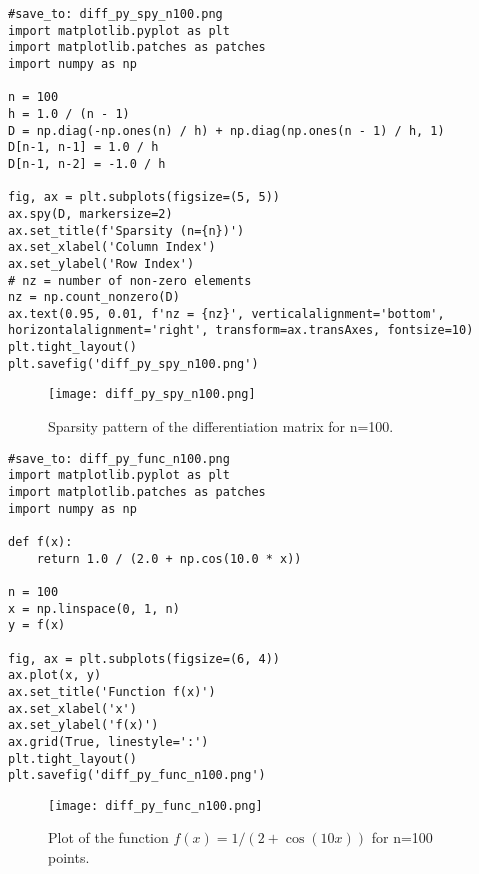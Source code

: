 \documentclass{article}
\begin{document}
\begin{verbatim}
#save_to: diff_py_spy_n100.png
import matplotlib.pyplot as plt
import matplotlib.patches as patches
import numpy as np

n = 100
h = 1.0 / (n - 1)
D = np.diag(-np.ones(n) / h) + np.diag(np.ones(n - 1) / h, 1)
D[n-1, n-1] = 1.0 / h
D[n-1, n-2] = -1.0 / h

fig, ax = plt.subplots(figsize=(5, 5))
ax.spy(D, markersize=2)
ax.set_title(f'Sparsity (n={n})')
ax.set_xlabel('Column Index')
ax.set_ylabel('Row Index')
# nz = number of non-zero elements
nz = np.count_nonzero(D)
ax.text(0.95, 0.01, f'nz = {nz}', verticalalignment='bottom', horizontalalignment='right', transform=ax.transAxes, fontsize=10)
plt.tight_layout()
plt.savefig('diff_py_spy_n100.png')
\end{verbatim}

\begin{figure}[H]
\centering
\texttt{[image: diff\_py\_spy\_n100.png]}
\caption{Sparsity pattern of the differentiation matrix for n=100.}
\label{fig:diff_py_spy_n100}
\end{figure}

\begin{verbatim}
#save_to: diff_py_func_n100.png
import matplotlib.pyplot as plt
import matplotlib.patches as patches
import numpy as np

def f(x):
    return 1.0 / (2.0 + np.cos(10.0 * x))

n = 100
x = np.linspace(0, 1, n)
y = f(x)

fig, ax = plt.subplots(figsize=(6, 4))
ax.plot(x, y)
ax.set_title('Function f(x)')
ax.set_xlabel('x')
ax.set_ylabel('f(x)')
ax.grid(True, linestyle=':')
plt.tight_layout()
plt.savefig('diff_py_func_n100.png')
\end{verbatim}

\begin{figure}[H]
\centering
\texttt{[image: diff\_py\_func\_n100.png]}
\caption{Plot of the function $f(x) = 1 / (2 + \cos(10x))$ for n=100 points.}
\label{fig:diff_py_func_n100}
\end{figure}
\end{document}
